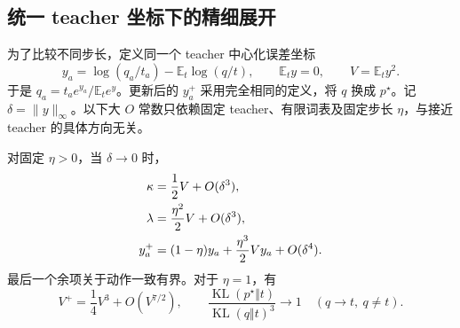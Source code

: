 \documentclass[lang=cn,scheme=chinese,openany]{../book/elegantbook}
\newcommand{\E}{\mathbb E}
\newcommand{\KL}{\operatorname{KL}}
\begin{document}
\subsection{统一 teacher 坐标下的精细展开}
\label{dyn:sec:mean-hard-sync-local-expansion}

为了比较不同步长，定义同一个 teacher 中心化误差坐标
\begin{equation}
 y_a=\log(q_a/t_a)-\E_t\log(q/t),
 \qquad \E_ty=0,\qquad V=\E_ty^2.
 \label{dyn:eq:mean-hard-sync-centered-coordinate}
\end{equation}
于是 $q_a=t_ae^{y_a}/\E_te^y$。更新后的 $y_a^+$ 采用完全相同的定义，将 $q$ 换成 $p^\star$。记 $\delta=\|y\|_\infty$。以下大 $O$ 常数只依赖固定 teacher、有限词表及固定步长 $\eta$，与接近 teacher 的具体方向无关。

\begin{theorem}
\label{dyn:thm:mean-hard-sync-local-expansion}
对固定 $\eta>0$，当 $\delta\to0$ 时，
\begin{align}
 \kappa&=\frac12V+O(\delta^3),\notag\\
 \lambda&=\frac{\eta^2}{2}V+O(\delta^3),\notag\\
 y_a^+&=(1-\eta)y_a+\frac{\eta^3}{2}Vy_a+O(\delta^4).
 \label{dyn:eq:mean-hard-sync-local-expansion}
\end{align}
最后一个余项关于动作一致有界。对于 $\eta=1$，有
\begin{equation}
 V^+=\frac14V^3+O(V^{7/2}),
 \qquad
 \frac{\KL(p^\star\Vert t)}{\KL(q\Vert t)^3}\longrightarrow1
 \quad(q\to t,\ q\ne t).
 \label{dyn:eq:mean-hard-sync-kl-cubic}
\end{equation}
\end{theorem}
\end{document}
